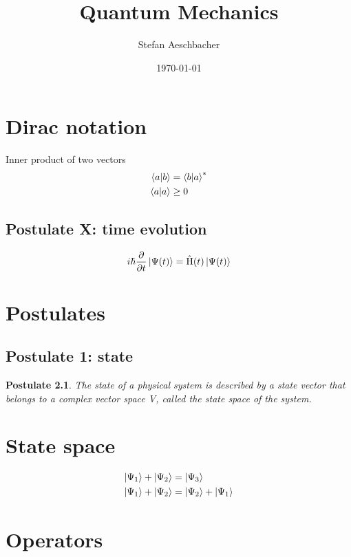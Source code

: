 \documentclass[10pt,a4paper]{book}
\title{Quantum Mechanics}
\author{Stefan Aeschbacher}
\date{\today}
\newtheorem{post}{Postulate}
\DeclareMathOperator {\opH} {\hat{H}}
\begin{document}
    \maketitle


   \chapter{Dirac notation}
    Inner product of two vectors
       \begin{align}
    \braket{a|b} &= \braket{b|a}^* \\
    \braket{a|a} &\ge 0
    \end{align}

    \section{Postulate X: time evolution}
    \begin{align}
    i\hbar \frac{ \partial } { \partial t } \ket{ \Psi(t) } = \opH(t)\ket{ \Psi(t) }
    \end{align}


    \chapter{Postulates}
    \section{Postulate 1: state}
    
    \begin{post}
    The state of a physical system is described by a state vector that belongs to a complex vector space V, called the state space of the system.
    \end{post}
    
    \chapter{State space}
    \begin{align}
    \ket{ \Psi_1} + \ket{ \Psi_2} &= \ket{ \Psi_3} \\
    \ket{ \Psi_1} + \ket{ \Psi_2} &= \ket{ \Psi_2} + \ket{ \Psi_1}
    \end{align}
    \chapter{Operators}
\end{document}
